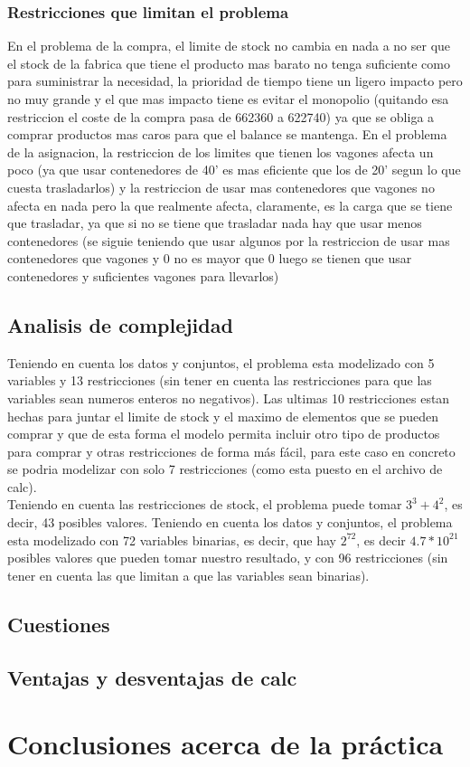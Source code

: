 \documentclass[11pt,spanish]{article}
\begin{document}
			\subsubsection{Restricciones que limitan el problema}
			En el problema de la compra, el limite de stock no cambia en nada a no ser que el stock de la fabrica que tiene el producto mas barato no tenga suficiente como para suministrar la necesidad, la prioridad de tiempo tiene un ligero impacto pero no muy grande y el que mas impacto tiene es evitar el monopolio (quitando esa restriccion el coste de la compra pasa de 662360 a 622740) ya que se obliga a comprar productos mas caros para que el balance se mantenga.
			En el problema de la asignacion, la restriccion de los limites que tienen los vagones afecta un poco (ya que usar contenedores de 40' es mas eficiente que los de 20' segun lo que cuesta trasladarlos) y la restriccion de usar mas contenedores que vagones no afecta en nada pero la que realmente afecta, claramente, es la carga que se tiene que trasladar, ya que si no se tiene que trasladar nada hay que usar menos contenedores (se siguie teniendo que usar algunos por la restriccion de usar mas contenedores que vagones y 0 no es mayor que 0 luego se tienen que usar contenedores y suficientes vagones para llevarlos)
		\subsection{Analisis de complejidad}
		Teniendo en cuenta los datos y conjuntos, el problema esta modelizado con 5 variables y 13 restricciones (sin tener en cuenta las restricciones para que las variables sean numeros enteros no negativos). Las ultimas 10 restricciones estan hechas para juntar el limite de stock y el maximo de elementos que se pueden comprar y que de esta forma el modelo permita incluir otro tipo de productos para comprar y otras restricciones de forma más fácil, para este caso en concreto se podria modelizar con solo 7 restricciones (como esta puesto en el archivo de calc).\\
		Teniendo en cuenta las restricciones de stock, el problema puede tomar $3^3+4^2$, es decir, 43 posibles valores.
		Teniendo en cuenta los datos y conjuntos, el problema esta modelizado con 72 variables binarias, es decir, que hay $2^{72}$, es decir $4.7*10^{21}$posibles valores que pueden tomar nuestro resultado, y con 96 restricciones (sin tener en cuenta las que limitan a que las variables sean binarias).
		\subsection{Cuestiones}
		\subsection{Ventajas y desventajas de calc}
		
	\section{Conclusiones acerca de la práctica}
	\newpage
\end{document}
